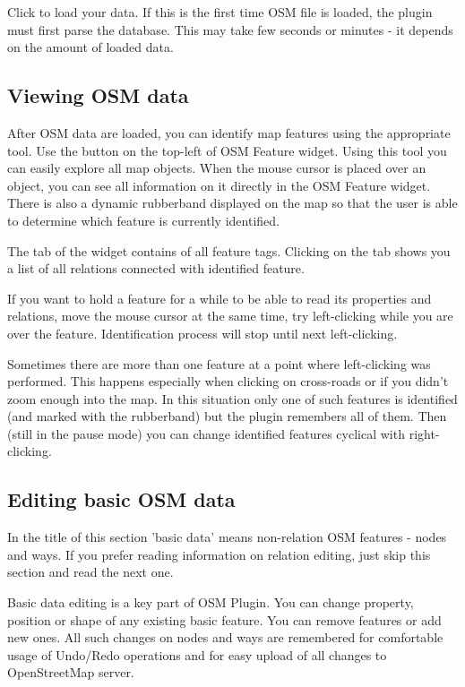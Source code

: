 Click  to load your data. If this is the first time OSM 
file is loaded, the plugin must first parse the database. This may take few 
seconds or minutes - it depends on the amount of loaded data.

\subsection{Viewing OSM data}

After OSM data are loaded, you can identify map features using the
appropriate tool. Use the  
button on the top-left of OSM Feature widget. Using this tool you can 
easily explore all map objects. When the mouse cursor is placed over an 
object, you can see all information on it directly in the OSM Feature widget. 
There is also a dynamic rubberband displayed on the map so that the user 
is able to determine which feature is currently identified.

The  tab of the widget contains of all feature tags. 
Clicking on the  tab shows you a list of all relations 
connected with identified feature.

If you want to hold a feature for a while to be able to read its properties 
and relations, move the mouse cursor at the same time, try left-clicking 
while you are over the feature. Identification process will stop until next 
left-clicking.

Sometimes there are more than one feature at a point where left-clicking
was performed. This happens especially when clicking on cross-roads or if 
you didn't zoom enough into the map. In this situation only one of such 
features is identified (and marked with the rubberband) but the plugin 
remembers all of them. Then (still in the pause mode) you can change 
identified features cyclical with right-clicking.

\subsection{Editing basic OSM data}

In the title of this section 'basic data' means non-relation OSM features -
nodes and ways. If you prefer reading information on relation editing, just
skip this section and read the next one.
 
Basic data editing is a key part of OSM Plugin. You can change property,
position or shape of any existing basic feature. You can remove features or
add new ones. All such changes on nodes and ways are remembered for 
comfortable usage of Undo/Redo operations and for easy upload of all changes
to OpenStreetMap server.

